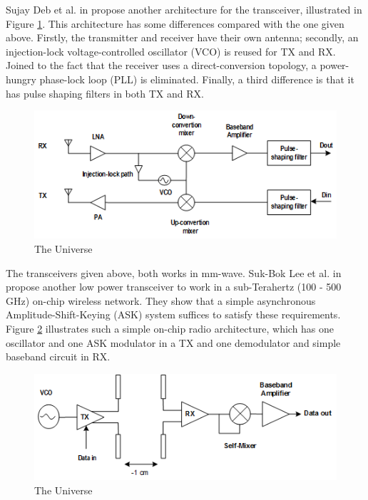 \documentclass[12pt]{article}
\begin{document}
Sujay Deb et al. in \citep{6302124} propose another architecture for the transceiver, illustrated in Figure \ref{fig:Fig_transceiverOOK}. This architecture has some differences compared with the one given above. Firstly, the transmitter and receiver have their own antenna; secondly, an injection-lock voltage-controlled oscillator (VCO) is reused for TX and RX. Joined to the fact that the receiver uses a direct-conversion topology, a power-hungry phase-lock loop (PLL) is eliminated. Finally, a third difference is that it has pulse shaping filters in both TX and RX.



\begin{figure}[ht!]
\centering
\includegraphics[scale=0.9]{transceiverOOK.png}
\caption{The Universe}
\label{fig:Fig_transceiverOOK}
\end{figure}



The transceivers given above, both works in mm-wave. Suk-Bok Lee et al. in \citep{lee2009scalable} propose another low power transceiver to work in a sub-Terahertz (100 - 500 GHz) on-chip wireless network. They show that a simple asynchronous Amplitude-Shift-Keying (ASK) system suffices to satisfy these requirements. Figure \ref{fig:Fig_transceiverOOK2} illustrates such a simple on-chip radio architecture, which has one oscillator and one ASK modulator in a TX and one demodulator and simple baseband circuit in RX.  


\begin{figure}[ht!]
\centering
\includegraphics[scale=0.9]{transceiverOOK2.png}
\caption{The Universe}
\label{fig:Fig_transceiverOOK2}
\end{figure}
\end{document}
